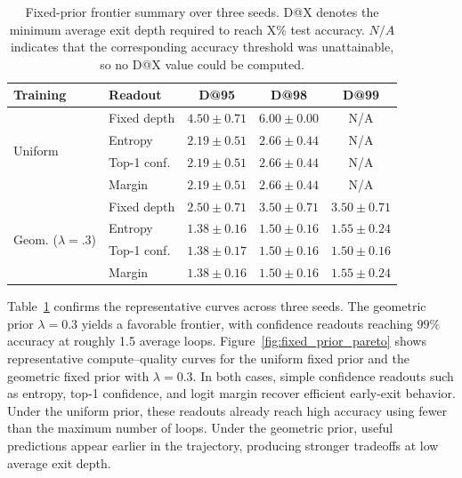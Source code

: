 \documentclass[10pt]{article} %
\renewcommand{\arraystretch}{0.9}
\begin{document}
\begin{table}[t]
\centering
\scriptsize
\setlength{\tabcolsep}{4pt}
\renewcommand{\arraystretch}{0.95}
\caption{
Fixed-prior frontier summary over three seeds.
D@X denotes the minimum average exit depth required to reach X\% test accuracy.
$N/A$ indicates that the corresponding accuracy threshold was unattainable, so no D@X value could be computed.
}
\label{tab:fixed_prior_frontier_summary}

\begin{tabular}{llccc}
\toprule
Training & Readout & D@95 & D@98 & D@99 \\
\midrule
\multirow{4}{*}{Uniform}
& Fixed depth & $4.50\pm0.71$ & $6.00\pm0.00$ & N/A \\
& Entropy     & $2.19\pm0.51$ & $2.66\pm0.44$ & N/A \\
& Top-1 conf. & $2.19\pm0.51$ & $2.66\pm0.44$ & N/A \\
& Margin      & $2.19\pm0.51$ & $2.66\pm0.44$ & N/A \\
\midrule
\multirow{4}{*}{Geom. ($\lambda=.3$)}
& Fixed depth & $2.50\pm0.71$ & $3.50\pm0.71$ & $3.50\pm0.71$ \\
& Entropy     & $1.38\pm0.16$ & $1.50\pm0.16$ & $1.55\pm0.24$ \\
& Top-1 conf. & $1.38\pm0.17$ & $1.50\pm0.16$ & $1.50\pm0.16$ \\
& Margin      & $1.38\pm0.16$ & $1.50\pm0.16$ & $1.55\pm0.24$ \\
\bottomrule
\end{tabular}
\end{table}

Table~\ref{tab:fixed_prior_frontier_summary} confirms the representative curves across three seeds. The geometric prior \(\lambda=0.3\) yields a favorable frontier, with confidence readouts reaching $99\%$ accuracy at roughly 1.5 average loops. Figure~\ref{fig:fixed_prior_pareto} shows representative compute--quality curves for the uniform fixed prior and the geometric fixed prior with \(\lambda=0.3\). In both cases, simple confidence readouts such as entropy, top-1 confidence, and logit margin recover efficient early-exit behavior. Under the uniform prior, these readouts already reach high accuracy using fewer than the maximum number of loops. Under the geometric prior, useful predictions appear earlier in the trajectory, producing stronger tradeoffs at low average exit depth.
\end{document}
